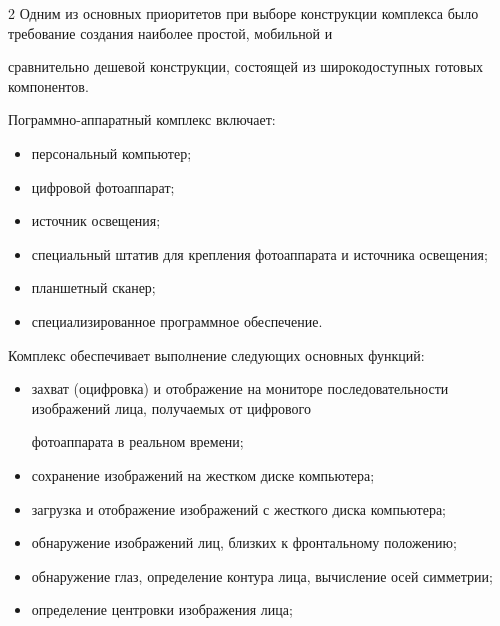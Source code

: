 \begin{multicols}{2}
Одним из основных приоритетов при выборе конструкции комплекса было требование создания наиболее простой, мобильной и 


сравнительно дешевой конструкции, состоящей из широкодоступных готовых компонентов.





Пограммно-аппаратный комплекс включает:


\begin{itemize}


\item персональный компьютер;


\item цифровой фотоаппарат;


\item источник освещения;


\item специальный штатив для крепления фотоаппарата и источника освещения;


\item планшетный сканер;


\item специализированное программное обеспечение.


\end{itemize}





Комплекс обеспечивает выполнение сле\-ду\-ющих основных функций:


\begin{itemize}


\item захват (оцифровка) и отображение на мониторе последовательности изображений лица, получаемых от цифрового 


фотоаппарата в реальном времени;


\item сохранение изображений на жестком диске компьютера;


\item загрузка и отображение изображений с жесткого диска компьютера;


\item обнаружение изображений лиц, близких к фронтальному положению;


\item обнаружение глаз, определение контура лица, вычисление осей симметрии;


\item определение центровки изображения лица;



\end{itemize}
\end{multicols}
